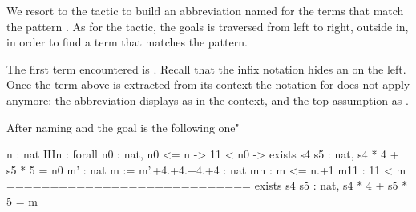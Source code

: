 We resort to the  tactic to build an abbreviation
named  for the terms that match the pattern . As for the
 tactic, the goals is traversed from left to right, outside
in, in order to find a term that matches the pattern.

The first term encountered is . Recall that
the \C{<} infix notation hides an  on the left. Once
the term above is extracted from its context the notation
for \C{<} does not apply anymore: the abbreviation 
displays as  in the context,
and the top assumption as .

After naming  and  the goal is the following one"

\begin{coqout}{}{}
  n : nat
  IHn : forall n0 : nat, n0 <= n ->
          11 < n0 -> exists s4 s5 : nat, s4 * 4 + s5 * 5 = n0
  m' : nat
  m := m'.+4.+4.+4.+4 : nat
  mn : m <= n.+1
  m11 : 11 < m
  ============================
  exists s4 s5 : nat, s4 * 4 + s5 * 5 = m
\end{coqout}

